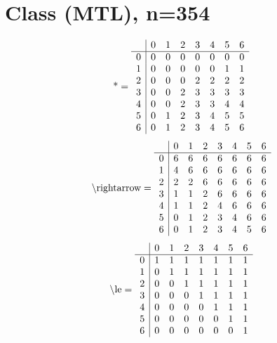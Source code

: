 \documentclass[11pt]{article}
\begin{document}
\section{Class (MTL), n=354}
\[\text{*} = 
\begin{array}{r | r r r r r r r}
 & 0 & 1 & 2 & 3 & 4 & 5 & 6 \\ \hline
0 & 0 & 0 & 0 & 0 & 0 & 0 & 0 \\
1 & 0 & 0 & 0 & 0 & 0 & 1 & 1 \\
2 & 0 & 0 & 0 & 2 & 2 & 2 & 2 \\
3 & 0 & 0 & 2 & 3 & 3 & 3 & 3 \\
4 & 0 & 0 & 2 & 3 & 3 & 4 & 4 \\
5 & 0 & 1 & 2 & 3 & 4 & 5 & 5 \\
6 & 0 & 1 & 2 & 3 & 4 & 5 & 6 \\
\end{array}
\]
\[\text{\textbackslash rightarrow} = 
\begin{array}{r | r r r r r r r}
 & 0 & 1 & 2 & 3 & 4 & 5 & 6 \\ \hline
0 & 6 & 6 & 6 & 6 & 6 & 6 & 6 \\
1 & 4 & 6 & 6 & 6 & 6 & 6 & 6 \\
2 & 2 & 2 & 6 & 6 & 6 & 6 & 6 \\
3 & 1 & 1 & 2 & 6 & 6 & 6 & 6 \\
4 & 1 & 1 & 2 & 4 & 6 & 6 & 6 \\
5 & 0 & 1 & 2 & 3 & 4 & 6 & 6 \\
6 & 0 & 1 & 2 & 3 & 4 & 5 & 6 \\
\end{array}
\]
\[\text{\textbackslash le} = 
\begin{array}{r | r r r r r r r}
 & 0 & 1 & 2 & 3 & 4 & 5 & 6 \\ \hline
0 & 1 & 1 & 1 & 1 & 1 & 1 & 1 \\
1 & 0 & 1 & 1 & 1 & 1 & 1 & 1 \\
2 & 0 & 0 & 1 & 1 & 1 & 1 & 1 \\
3 & 0 & 0 & 0 & 1 & 1 & 1 & 1 \\
4 & 0 & 0 & 0 & 0 & 1 & 1 & 1 \\
5 & 0 & 0 & 0 & 0 & 0 & 1 & 1 \\
6 & 0 & 0 & 0 & 0 & 0 & 0 & 1 \\
\end{array}
\]
\end{document}
